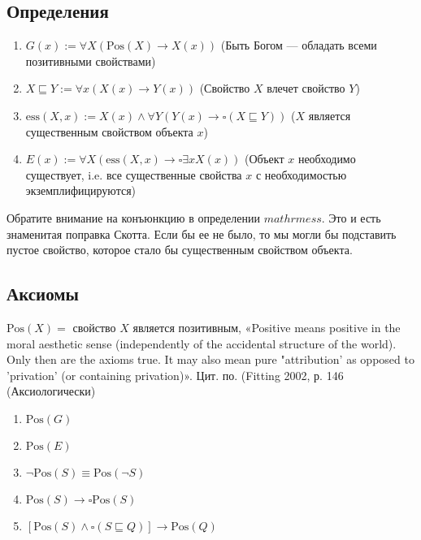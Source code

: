 \documentclass[openany]{book}
\theoremstyle{plain}
\theoremstyle{definition}
\begin{document}
\subsection{Определения}
\begin{enumerate}
    \item \(G(x) := \forall X (\mathrm{Pos}(X) \rightarrow X(x))\) (Быть Богом --- обладать всеми позитивными свойствами)
    \item \(X \sqsubseteq Y := \forall x (X(x) \rightarrow Y(x))\) (Свойство \(X\) влечет свойство \(Y\))
    \item \(\mathrm{ess}(X, x) := X(x) \land \forall Y (Y(x) \rightarrow \square (X \sqsubseteq Y))\) (\(X\) является существенным свойством объекта \(x\))
    \item \(E(x) := \forall X (\mathrm{ess}(X, x) \rightarrow \square \exists x X(x))\) (Объект \(x\) необходимо существует, i.e. все существенные свойства \(x\) с необходимостью экземплифицируются)
\end{enumerate}

Обратите внимание на конъюнкцию в определении \(mathrm{ess}\). Это и есть знаменитая поправка Скотта. Если бы ее не было, то мы могли бы подставить пустое свойство, которое стало бы существенным  свойством объекта.

\subsection{Аксиомы}

\(\mathrm{Pos}(X) =\) свойство \(X\) является позитивным,
«Positive means positive in the moral aesthetic sense (independently of the accidental structure of the world). Only then are the axioms true. It may also mean pure "attribution' as opposed to 'privation' (or containing privation)». Цит. по. (Fitting 2002, р. 146 (Аксиологически)

\begin{enumerate}
    \item \(\mathrm{Pos}(G)\)

    \item \(\mathrm{Pos}(E)\)

    \item \(\neg \mathrm{Pos}(S) \equiv \mathrm{Pos}(\neg S)\)
    \item \(\mathrm{Pos}(S) \to \square \mathrm{Pos}(S)\)
    \item \([\mathrm{Pos}(S) \land \square (S \sqsubseteq Q)] \to \mathrm{Pos}(Q)\)
\end{enumerate}
\end{document}
